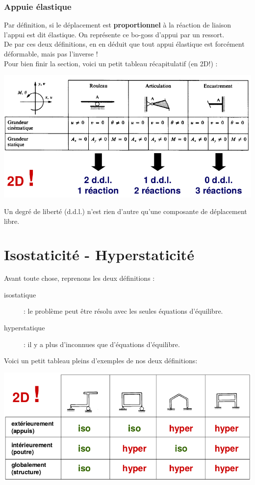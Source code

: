 		\subsubsection{Appuie élastique}
		Par définition, si le déplacement est \textbf{proportionnel} à la 
		réaction de liaison l'appui est dit élastique. On représente ce 
		bo-goss d’appui par un ressort.\\
				
		De par ces deux définitions, en en déduit que tout appui élastique 
		est forcément déformable, mais pas l'inverse ! \\
		Pour bien finir la section, voici un petit tableau récapitulatif 
		(en 2D!) :
		\begin{center}
		\includegraphics[scale=0.45]{ch2/image1}
		\end{center}
		Un degré de liberté (d.d.l.) n'est rien d'autre qu'une composante 
		de déplacement libre.
		
\section{Isostaticité - Hyperstaticité}
Avant toute chose, reprenons les deux définitions :
\begin{description}
\item[isostatique]: le problème peut être résolu avec les seules équations 
d'équilibre.
\item[hyperstatique]: il y a plus d'inconnues que d'équations d'équilibre.
\end{description}
Voici un petit tableau pleins d'exemples de nos deux définitions:
\begin{center}
\includegraphics[scale=0.45]{ch2/image2}
\end{center}


